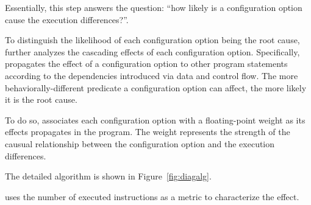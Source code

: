 Essentially, this step answers the question:
``how likely is a configuration
option cause the execution differences?''.




To distinguish the likelihood of each configuration
option being the root cause, \ourtool further analyzes
the cascading effects of each configuration option.
Specifically, \ourtool propagates the effect of
a configuration option to other program statements
according to the dependencies introduced via data and control flow.
The more behaviorally-different predicate a
configuration option can affect, the more likely it is
the root cause.

To do so, \ourtool associates each configuration option
with a floating-point weight as its effects propagates
in the program.  The weight represents the strength of
the causual relationship between the configuration option
and the execution differences.

The detailed algorithm is shown in Figure~\ref{fig:diagalg}.

\ourtool uses the number of executed instructions
as a metric to characterize the effect.




%


